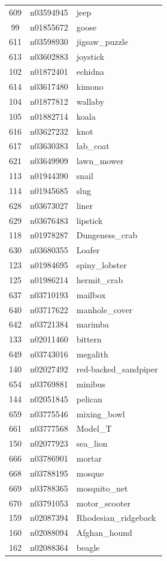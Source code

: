 \begin{table}
\begin{tabular}{cll}
609 & n03594945 & jeep \\
99 & n01855672 & goose \\
611 & n03598930 & jigsaw_puzzle \\
613 & n03602883 & joystick \\
102 & n01872401 & echidna \\
614 & n03617480 & kimono \\
104 & n01877812 & wallaby \\
105 & n01882714 & koala \\
616 & n03627232 & knot \\
617 & n03630383 & lab_coat \\
621 & n03649909 & lawn_mower \\
113 & n01944390 & snail \\
114 & n01945685 & slug \\
628 & n03673027 & liner \\
629 & n03676483 & lipstick \\
118 & n01978287 & Dungeness_crab \\
630 & n03680355 & Loafer \\
123 & n01984695 & spiny_lobster \\
125 & n01986214 & hermit_crab \\
637 & n03710193 & mailbox \\
640 & n03717622 & manhole_cover \\
642 & n03721384 & marimba \\
133 & n02011460 & bittern \\
649 & n03743016 & megalith \\
140 & n02027492 & red-backed_sandpiper \\
654 & n03769881 & minibus \\
144 & n02051845 & pelican \\
659 & n03775546 & mixing_bowl \\
661 & n03777568 & Model_T \\
150 & n02077923 & sea_lion \\
666 & n03786901 & mortar \\
668 & n03788195 & mosque \\
669 & n03788365 & mosquito_net \\
670 & n03791053 & motor_scooter \\
159 & n02087394 & Rhodesian_ridgeback \\
160 & n02088094 & Afghan_hound \\
162 & n02088364 & beagle \\

\end{tabular}
\end{table}
